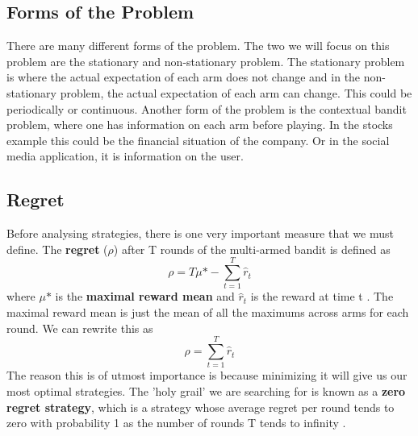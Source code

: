 \subsection{Forms of the Problem}\label{subsec:forms-of-the-problem}
There are many different forms of the problem.
The two we will focus on this problem are the stationary and non-stationary problem.
The stationary problem is where the actual expectation of each arm does not change and in the non-stationary problem, the actual expectation of each arm can change.
This could be periodically or continuous.
Another form of the problem is the contextual bandit problem, where one has information on each arm before playing.
In the stocks example this could be the financial situation of the company.
Or in the social media application, it is information on the user.

\subsection{Regret}\label{subsec:regret}
Before analysing strategies, there is one very important measure that we must define.
The \textbf{regret} ($\rho$) after T rounds of the multi-armed bandit is defined as $$\rho = T\mu\mbox{*} - \sum_{t=1}^T\hat{r}_t$$ where $\mu\mbox{*}$ is the \textbf{maximal reward mean} and $\hat{r}_t$ is the reward at time t \citep{vermorel}.
The maximal reward mean is just the mean of all the maximums across arms for each round.
We can rewrite this as $$\rho = \sum_{t=1}^T\hat{r}_t$$ The reason this is of utmost importance is because minimizing it will give us our most optimal strategies.
The 'holy grail' we are searching for is known as a \textbf{zero regret strategy}, which is a strategy whose average regret per round tends to zero with probability 1 as the number of rounds T tends to infinity \citep{vermorel}.
